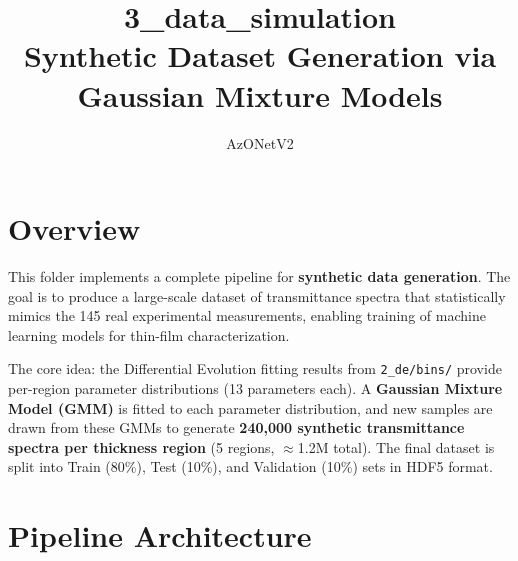 \documentclass[11pt,a4paper]{article}
\title{\textbf{3\_data\_simulation} \\ Synthetic Dataset Generation via \\ Gaussian Mixture Models}
\author{AzONetV2}
\date{}
\begin{document}
\maketitle

\section{Overview}

This folder implements a complete pipeline for \textbf{synthetic data generation}. The goal is to produce a large-scale dataset of transmittance spectra that statistically mimics the 145 real experimental measurements, enabling training of machine learning models for thin-film characterization.

The core idea: the Differential Evolution fitting results from {\tt 2\_de/bins/} provide per-region parameter distributions (13 parameters each). A \textbf{Gaussian Mixture Model (GMM)} is fitted to each parameter distribution, and new samples are drawn from these GMMs to generate \textbf{240,000 synthetic transmittance spectra per thickness region} (5 regions, $\approx$1.2M total). The final dataset is split into Train (80\%), Test (10\%), and Validation (10\%) sets in HDF5 format.

\section{Pipeline Architecture}
\end{document}
